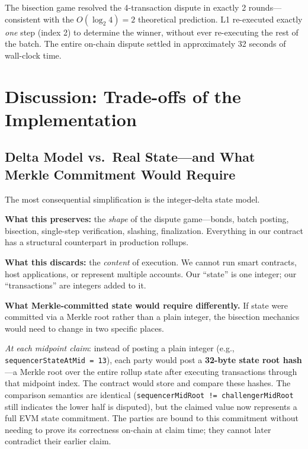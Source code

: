 \documentclass[11pt,letterpaper]{article}
\begin{document}
The bisection game resolved the 4-transaction dispute in exactly 2 rounds---consistent with the $O(\log_2 4) = 2$ theoretical prediction. L1 re-executed exactly \emph{one} step (index 2) to determine the winner, without ever re-executing the rest of the batch. The entire on-chain dispute settled in approximately 32 seconds of wall-clock time.

\section{Discussion: Trade-offs of the Implementation}
\label{sec:discussion}

\subsection{Delta Model vs.\ Real State---and What Merkle Commitment Would Require}

The most consequential simplification is the integer-delta state model.

\textbf{What this preserves:} the \emph{shape} of the dispute game---bonds, batch posting, bisection, single-step verification, slashing, finalization. Everything in our contract has a structural counterpart in production rollups.

\textbf{What this discards:} the \emph{content} of execution. We cannot run smart contracts, host applications, or represent multiple accounts. Our ``state'' is one integer; our ``transactions'' are integers added to it.

\textbf{What Merkle-committed state would require differently.} If state were committed via a Merkle root rather than a plain integer, the bisection mechanics would need to change in two specific places.

\emph{At each midpoint claim}: instead of posting a plain integer (e.g., \texttt{sequencerStateAtMid = 13}), each party would post a \textbf{32-byte state root hash}---a Merkle root over the entire rollup state after executing transactions through that midpoint index. The contract would store and compare these hashes. The comparison semantics are identical (\texttt{sequencerMidRoot != challengerMidRoot} still indicates the lower half is disputed), but the claimed value now represents a full EVM state commitment. The parties are bound to this commitment without needing to prove its correctness on-chain at claim time; they cannot later contradict their earlier claim.
\end{document}
